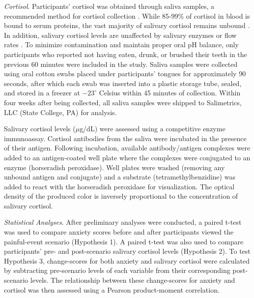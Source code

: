 \documentclass[review]{elsarticle}\usepackage[]{graphicx}\usepackage[]{color}
\begin{document}
\emph{Cortisol}. Participants' cortisol was obtained through saliva samples, a recommended method for cortisol collection \cite{salimetrics2011saliva}.
While 85-99\% of cortisol in blood is bound to serum proteins, the vast majority of salivary cortisol remains unbound \cite{vining1983hormones}.
In addition, salivary cortisol levels are unaffected by salivary enzymes or flow rates \cite{vining1987measurement}.
To minimize contamination and maintain proper oral pH balance, only participants who reported not having eaten, drunk, or brushed their teeth in the previous 60 minutes were included in the study.
Saliva samples were collected using oral cotton swabs placed under participants' tongues for approximately 90 seconds, after which each swab was inserted into a plastic storage tube, sealed, and stored in a freezer at $-23^{\circ}$ Celsius within 45 minutes of collection.
Within four weeks after being collected, all saliva samples were shipped to Salimetrics, LLC (State College, PA) for analysis.

Salivary cortisol levels ($\mu$g/dL) were assessed using a competitive enzyme immunoassay.
Cortisol antibodies from the saliva were incubated in the presence of their antigen.
Following incubation, available antibody/antigen complexes were added to an antigen-coated well plate where the complexes were conjugated to an enzyme (horseradish peroxidase).
Well plates were washed (removing any unbound antigen and conjugate) and a substrate (tetramethylbenzidine) was added to react with the horseradish peroxidase for visualization.
The optical density of the produced color is inversely proportional to the concentration of salivary cortisol.

\emph{Statistical Analyses}. After preliminary analyses were conducted, a paired t-test was used to compare anxiety scores before and after participants viewed the painful-event scenario (Hypothesis 1). 
A paired t-test was also used to compare participants' pre- and post-scenario salivary cortisol levels (Hypothesis 2).
To test Hypothesis 3, change-scores for both anxiety and salivary cortisol were calculated by subtracting pre-scenario levels of each variable from their corresponding post-scenario levels.
The relationship between these change-scores for anxiety and cortisol was then assessed using a Pearson product-moment correlation.
\end{document}
